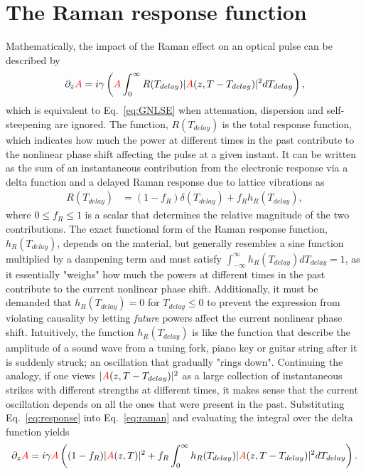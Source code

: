 \section{The Raman response function}
Mathematically, the impact of the Raman effect on an optical pulse can be described by
\begin{align}
\label{eq:raman}
 \partial_z \textcolor{red}{A} = i\gamma\left( 
\textcolor{red}{A} \int_{0}^{\infty} R(T_{delay})|\textcolor{red}{A}(z,T-T_{delay})|^2 dT_{delay} \right),
\end{align}
which is equivalent to Eq.~\ref{eq:GNLSE} when attenuation, dispersion and self-steepening are ignored. The function, $R(T_{delay})$ is the total response function, which indicates how much the power at different times in the past contribute to the nonlinear phase shift affecting the pulse at a given instant. It can be written as the sum of an instantaneous contribution from the electronic response via a delta function and a delayed Raman response due to lattice vibrations as
\begin{align}
    \label{eq:response}
    R(T_{delay})&= (1-f_R)\delta(T_{delay})+f_Rh_R(T_{delay}),
\end{align}
where $0\leq f_R\leq 1$ is a scalar that determines the relative magnitude of the two contributions. The exact functional form of the Raman response function, $h_R(T_{delay})$, depends on the material, but generally resembles a sine function multiplied by a dampening term and must satisfy $\int_{-\infty}^{\infty}h_R(T_{delay}) dT_{delay}=1$, as it essentially "weighs" how much the powers at different times in the past contribute to the current nonlinear phase shift. Additionally, it must be demanded that $h_R(T_{delay})=0$ for $T_{delay}\leq0$ to prevent the expression from violating causality by letting \emph{future} powers affect the current nonlinear phase shift. 
Intuitively, the function $h_R(T_{delay})$ is like the function that describe the amplitude of a sound wave from a tuning fork, piano key or guitar string after it is suddenly struck; an oscillation that gradually "rings down". Continuing the analogy, if one views $|\textcolor{red}{A}(z,T-T_{delay})|^2$ as a large collection of instantaneous strikes with different strengths at different times, it makes sense that the current oscillation depends on all the ones that were present in the past.  
Substituting Eq.~\ref{eq:response} into Eq.~\ref{eq:raman} and evaluating the integral over the delta function yields
\begin{align}
    \label{eq:raman_split}
    \partial_z \textcolor{red}{A} = i\gamma\textcolor{red}{A}\left( 
(1-f_R)|\textcolor{red}{A}(z,T)|^2+f_R \int_{0}^{\infty} h_R(T_{delay})|\textcolor{red}{A}(z,T-T_{delay})|^2 dT_{delay} \right).
\end{align}

